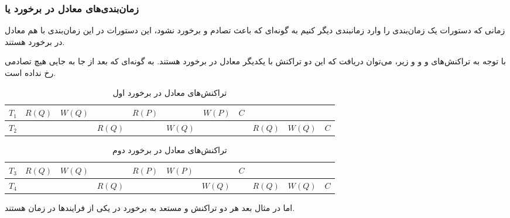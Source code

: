 \documentclass[a4paper]{article}
\begin{document}
\subsubsection{زمان‌بندی‌های معادل در برخورد یا }

زمانی که دستورات یک زمان‌بندی را وارد زمانبندی دیگر کنیم به گونه‌ای که باعث تصادم
و برخورد نشود، این دستورات در این زمان‌بندی با هم معادل در برخورد هستند.

با توجه به تراکنش‌های  و  و  و 
زیر، می‌توان دریافت که این دو تراکنش با یکدیگر معادل در برخورد هستند. به گونه‌ای
که بعد از جا به جایی هیچ تصادمی رخ نداده است.

\begin{LTR}
    \begin{table}[h]
        \centering
        \begin{RTL}
            \caption{تراکنش‌های معادل در برخورد اول}
        \end{RTL}
        \begin{tabular}{|c|c|c|c|c|c|c|c|c|c|c|}
            \hline
            $T_{1}$ & $R(Q)$ & $W(Q)$ & & $R(P)$ & & $W(P)$ & $C$ & & & \\ \hline
            $T_{2}$ & & & $R(Q)$ & & $W(Q)$ & &  & $R(Q)$ & $W(Q)$ & $C$ \\ \hline
        \end{tabular}
    \end{table}
\end{LTR}

\begin{LTR}
    \begin{table}[h]
        \centering
        \begin{RTL}
            \caption{تراکنش‌های معادل در برخورد دوم}
        \end{RTL}
        \begin{tabular}{|c|c|c|c|c|c|c|c|c|c|c|}
            \hline
            $T_{3}$ & $R(Q)$ & $W(Q)$ & & $R(P)$ & $W(P)$ & & $C$ & & & \\ \hline
            $T_{4}$ & & & $R(Q)$ & & & $W(Q)$ &  & $R(Q)$ & $W(Q)$ & $C$ \\ \hline
        \end{tabular}
    \end{table}
\end{LTR}

\newpage

اما در مثال بعد هر دو تراکنش  و  مستعد به برخورد در یکی
از فرایند‌ها در زمان هستند.
\end{document}
